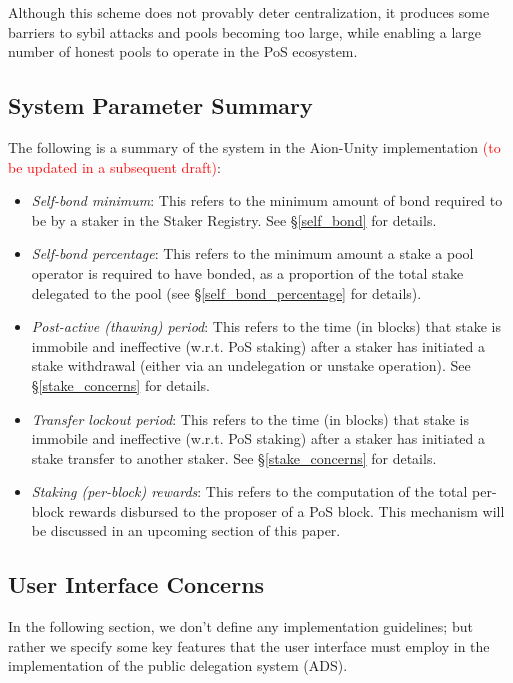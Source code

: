 Although this scheme does not provably deter centralization, it produces some barriers to sybil attacks and pools becoming too large, while enabling a large number of honest pools to operate in the PoS ecosystem.

\subsection{System Parameter Summary} \label{unspecified_parameters}
The following is a summary of the system in the Aion-Unity implementation \textcolor{red}{(to be updated in a subsequent draft)}: 
\begin{itemize}
    \item \textit{Self-bond minimum}: This refers to the minimum amount of bond required to be  by a staker in the Staker Registry. See \S\ref{self_bond} for details.
    \item \textit{Self-bond percentage}: This refers to the minimum amount a stake a pool operator is required to have bonded, as a proportion of the total stake delegated to the pool (see \S\ref{self_bond_percentage} for details).
    \item \textit{Post-active (thawing) period}: This refers to the time (in blocks) that stake is immobile and ineffective (w.r.t. PoS staking) after a staker has initiated a stake withdrawal (either via an undelegation or unstake operation). See \S\ref{stake_concerns} for details. 
    \item \textit{Transfer lockout period}: This refers to the time (in blocks) that stake is immobile and ineffective (w.r.t. PoS staking) after a staker has initiated a stake transfer to another staker. See \S\ref{stake_concerns} for details. 
    \item \textit{Staking (per-block) rewards}: This refers to the computation of the total per-block rewards disbursed to the proposer of a PoS block. This mechanism will be discussed in an upcoming section of this paper. 
\end{itemize}

\clearpage
\subsection{User Interface Concerns} \label{ads_ui}
In the following section, we don't define any implementation guidelines; but rather we specify some key features that the user interface must employ in the implementation of the public delegation system (ADS). 

